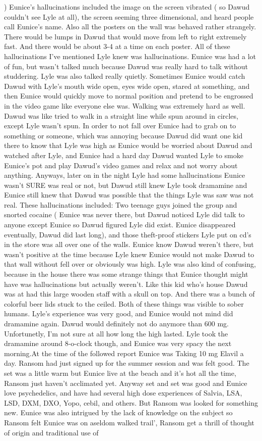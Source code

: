 \documentclass[12pt]{book}
\begin{document}
) Eunice's hallucinations included the image on the screen vibrated ( so Dawud couldn't see Lyle at all), the screen seeming three dimensional, and heard people call Eunice's name. Also all the posters on the wall was behaved rather strangely. There would be lumps in Dawud that would move from left to right extremely fast. And there would be about 3-4 at a time on each poster. All of these hallucinations I've mentioned Lyle knew was hallucinations. Eunice was had a lot of fun, but wasn't talked much because Dawud was really hard to talk without studdering. Lyle was also talked really quietly. Sometimes Eunice would catch Dawud with Lyle's mouth wide open, eyes wide open, stared at something, and then Eunice would quickly move to normal position and pretend to be engrossed in the video game like everyone else was. Walking was extremely hard as well. Dawud was like tried to walk in a straight line while spun around in circles, except Lyle wasn't spun. In order to not fall over Eunice had to grab on to something or someone, which was annoying because Dawud did want one kid there to know that Lyle was high as Eunice would be worried about Dawud and watched after Lyle, and Eunice had a hard day Dawud wanted Lyle to smoke Eunice's pot and play Dawud's video games and relax and not worry about anything. Anyways, later on in the night Lyle had some hallucinations Eunice wasn't SURE was real or not, but Dawud still knew Lyle took dramamine and Eunice still knew that Dawud was possible that the things Lyle was saw was not real. These hallucinations included: Two teenage guys joined the group and snorted cocaine ( Eunice was never there, but Dawud noticed Lyle did talk to anyone except Eunice so Dawud figured Lyle did exist. Eunice disappeared eventually, Dawud did last long), and those theft-proof stickers Lyle put on cd's in the store was all over one of the walls. Eunice know Dawud weren't there, but wasn't positive at the time because Lyle knew Eunice would not make Dawud to that wall without fell over or obviously was high. Lyle was also kind of confusing, because in the house there was some strange things that Eunice thought might have was hallucinations but actually weren't. Like this kid who's house Dawud was at had this large wooden staff with a skull on top. And there was a bunch of colorful beer lids stuck to the ceiled. Both of these things was visible to sober humans. Lyle's experience was very good, and Eunice would not mind did dramamine again. Dawud would definitely not do anymore than 600 mg. Unfortunetly, I'm not sure at all how long the high lasted. Lyle took the dramamine around 8-o-clock though, and Eunice was very spacy the next morning.At the time of the followed report Eunice was Taking 10 mg Elavil a day. Ransom had just signed up for the summer session and was felt good. The set was a little warm but Eunice live at the beach and it's hot all the time, Ransom just haven't acclimated yet. Anyway set and set was good and Eunice love psychedelics, and have had several high dose experiences of Salvia, LSA, LSD, DXM, DXO, Yopo, cebil, and others. But Ransom was looked for something new. Eunice was also intrigued by the lack of knowledge on the subject so Ransom felt Eunice was on aseldom walked trail', Ransom get a thrill of thought of origin and traditional use of 
\end{document}
